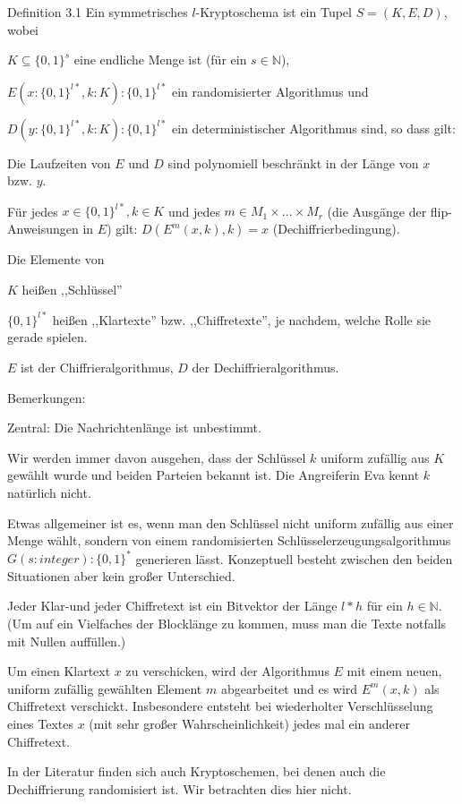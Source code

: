 \documentclass[a4paper]{article}
\begin{document}
\begin{multicols}{3}
    Definition 3.1 Ein symmetrisches $l$-Kryptoschema ist ein Tupel $S= (K,E,D)$, wobei
    \begin{itemize*}
        \item $K\subseteq\{0,1\}^s$ eine endliche Menge ist (für ein $s\in\mathbb{N}$),
        \item $E(x:\{0,1\}^{l*},k:K) :\{0,1\}^{l*}$ ein randomisierter Algorithmus und
        \item $D(y:\{0,1\}^{l*},k:K) :\{0,1\}^{l*}$ ein deterministischer Algorithmus
        sind, so dass gilt:
        \item Die Laufzeiten von $E$ und $D$ sind polynomiell beschränkt in der Länge von $x$ bzw. $y$.
        \item Für jedes $x\in\{0,1\}^{l*},k\in K$ und jedes $m\in M_1\times...\times M_r$ (die Ausgänge der flip-Anweisungen in $E$) gilt: $D(E^m(x,k),k)=x$ (Dechiffrierbedingung).
    \end{itemize*}

    Die Elemente von
    \begin{itemize*}
        \item $K$ heißen ,,Schlüssel''
        \item $\{0,1\}^{l*}$ heißen ,,Klartexte'' bzw. ,,Chiffretexte'', je nachdem, welche Rolle sie gerade spielen.
    \end{itemize*}

    $E$ ist der Chiffrieralgorithmus, $D$ der Dechiffrieralgorithmus.

    Bemerkungen:
    \begin{itemize*}
        \item Zentral: Die Nachrichtenlänge ist unbestimmt.
        \item Wir werden immer davon ausgehen, dass der Schlüssel $k$ uniform zufällig aus $K$ gewählt wurde und beiden Parteien bekannt ist. Die Angreiferin Eva kennt $k$ natürlich nicht.
        \item Etwas allgemeiner ist es, wenn man den Schlüssel nicht uniform zufällig aus einer Menge wählt, sondern von einem randomisierten Schlüsselerzeugungsalgorithmus $G(s:integer):\{0,1\}^*$ generieren lässt. Konzeptuell besteht zwischen den beiden Situationen aber kein großer Unterschied.
        \item Jeder Klar-und jeder Chiffretext ist ein Bitvektor der Länge $l*h$ für ein $h\in\mathbb{N}$. (Um auf ein Vielfaches der Blocklänge zu kommen, muss man die Texte notfalls mit Nullen auffüllen.)
        \item Um einen Klartext $x$ zu verschicken, wird der Algorithmus $E$ mit einem neuen, uniform zufällig gewählten Element $m$ abgearbeitet und es wird $E^m(x,k)$ als Chiffretext verschickt. Insbesondere entsteht bei wiederholter Verschlüsselung eines Textes $x$ (mit sehr großer Wahrscheinlichkeit) jedes mal ein anderer Chiffretext.
        \item In der Literatur finden sich auch Kryptoschemen, bei denen auch die Dechiffrierung randomisiert ist. Wir betrachten dies hier nicht.
    \end{itemize*}


\end{multicols}
\end{document}
